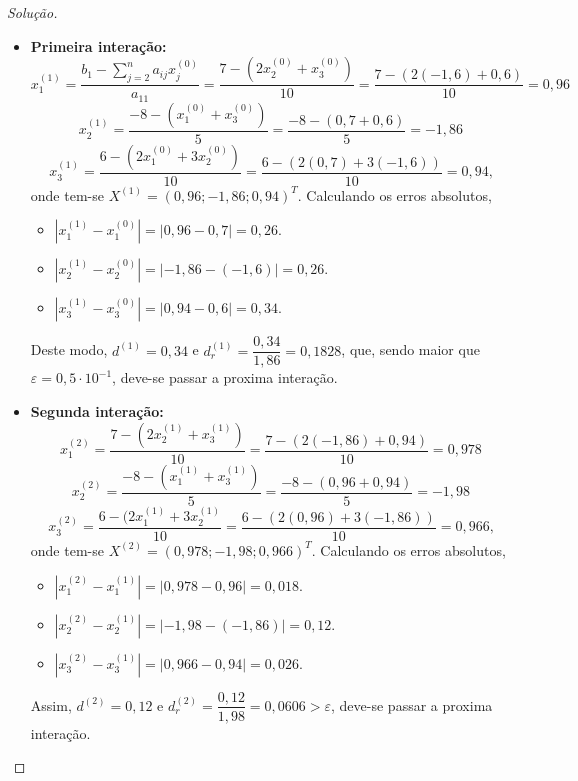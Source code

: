 \documentclass[
	12pt,				%
	openright,			%
	twoside,			%
	a4paper,			%
	english,			%
	french,				%
	brazil,				%
	sumario=tradicional
]{abntex2}
\newenvironment{solution}{
	\begin{proof}[Solução]
}{\end{proof}}
\numberwithin{example}{chapter}
\numberwithin{remark}{chapter}
\numberwithin{definition}{chapter}
\numberwithin{figure}{chapter}
\begin{document}
\begin{solution}
	\hfill
	
	\begin{itemize}
	    \item \textbf{Primeira interação:}\hfill
	    $$
	        x_1^{(1)}=\frac{b_1-\displaystyle \sum_{j=2}^n a_{ij}x_j^{(0)}}{a_11}
	        =
	        \frac{7-(2x_2^{(0)} + x_3^{(0)})}{10}
	        =
	        \frac{7-(2(-1,6)+0,6)}{10}
	        =0,96
	    $$
	    $$
	        x_2^{(1)}=\frac{-8-(x_1^{(0)}+x_3^{(0)})}{5}
	        =
	        \frac{-8-(0,7+0,6)}{5}
	        =-1,86
	    $$
	    $$
	        x_3^{(1)}=\frac{6-(2x_1^{(0)}+3x_2^{(0)})}{10}
	        =
	        \frac{6-(2(0,7)+3(-1,6))}{10}
	        =0,94
	        \text{,}
	    $$
	    onde tem-se $X^{(1)}=(0,96; -1,86; 0,94)^T$. Calculando os erros absolutos,
	    \begin{itemize}
	        \item $|x_1^{(1)}-x_1^{(0)}|=|0,96-0,7|=0,26$.
	        \item $|x_2^{(1)}-x_2^{(0)}|=|-1,86-(-1,6)|=0,26$.
	        \item $|x_3^{(1)}-x_3^{(0)}|=|0,94-0,6|=0,34$.
	    \end{itemize}
	    
	    Deste modo, $d^{(1)}=0,34$ e $d_r^{(1)}=\dfrac{0,34}{1,86}=0,1828$, que, sendo maior que $\varepsilon=0,5\cdot 10^{-1}$, deve-se passar a proxima interação.
	
	    \item \textbf{Segunda interação: }\hfill
	    $$
	        x_1^{(2)}=\frac{7-(2x_2^{(1)}+x_3^{(1)})}{10}
	        =
	        \frac{7-(2(-1,86)+0,94)}{10}
	        =0,978
	    $$
	    $$
	        x_2^{(2)}=\frac{-8-(x_1^{(1)}+x_3^{(1)})}{5}
	        =
	        \frac{-8-(0,96+0,94)}{5}
	        =-1,98
	    $$
	    $$
	        x_3^{(2)}=\frac{6-(2x_1^{(1)}+3x_2^{(1)}}{10}
	        =
	        \frac{6-(2(0,96)+3(-1,86))}{10}
	        =0,966
	        \text{,}
	    $$
	    onde tem-se $X^{(2)}=(0,978; -1,98; 0,966)^T$. Calculando os erros absolutos,
	    \begin{itemize}
	        \item $|x_1^{(2)}-x_1^{(1)}|=|0,978-0,96|=0,018$.
	        \item $|x_2^{(2)}-x_2^{(1)}|=|-1,98-(-1,86)|=0,12$.
	        \item $|x_3^{(2)}-x_3^{(1)}|=|0,966-0,94|=0,026$.
	    \end{itemize}
	
	    Assim, $d^{(2)}=0,12$ e $d_r^{(2)}=\dfrac{0,12}{1,98}=0,0606>\varepsilon$, deve-se passar a proxima interação.
	    

\end{itemize}
\end{solution}
\end{document}
